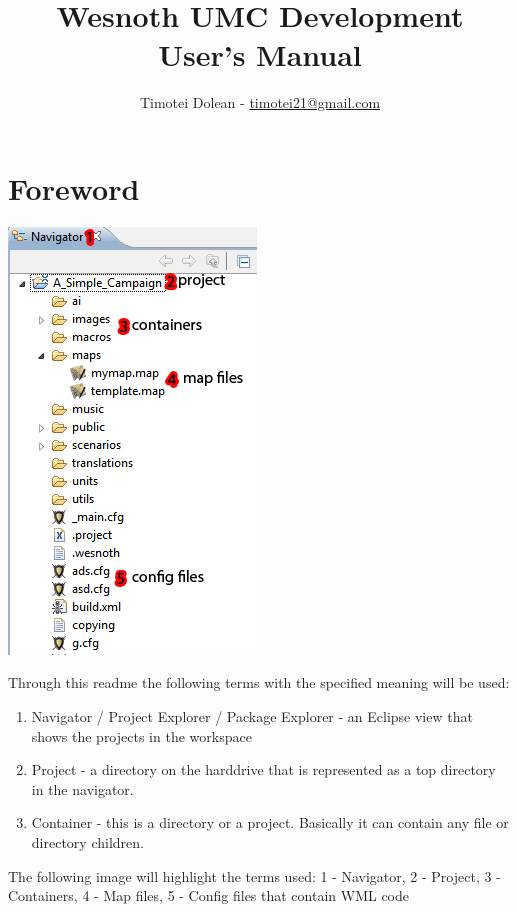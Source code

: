 \documentclass[10pt]{article}
\title{Wesnoth UMC Development \\ User's Manual}
\author{Timotei Dolean - \href{mailto:timotei21@gmail.com}{timotei21@gmail.com}}
\begin{document}
\maketitle

\tableofcontents
\setcounter{tocdepth}{3}
\newpage

\newcommand{\icnt}{ \stepcounter{cnt} \thecnt }

\section{Foreword}
\begin{multicols}{2}
  \begin{center}
    \includegraphics[scale=0.6]{definitions.png}
  \end{center}
Through this readme the following terms with the specified meaning will be used:
\begin{enumerate}
\item Navigator / Project Explorer / Package Explorer - an Eclipse view that shows the projects in the workspace
\item Project - a directory on the harddrive that is represented as a top directory in the navigator.
\item Container - this is a directory or a project. Basically it can contain any file or directory children.
\end{enumerate}

The following image will highlight the terms used: 1 - Navigator, 2 - Project, 3 - Containers, 4 - Map files, 5 - Config files that contain WML code
\end{multicols}
\end{document}
